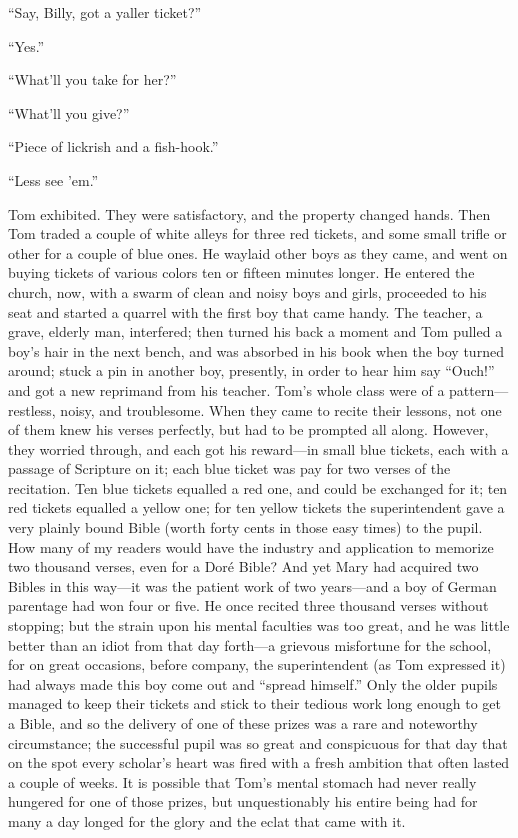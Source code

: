 \documentclass{book}
\begin{document}
“Say, Billy, got a yaller ticket?”

“Yes.”

“What’ll you take for her?”

“What’ll you give?”

“Piece of lickrish and a fish-hook.”

“Less see ’em.”

Tom exhibited. They were satisfactory, and the property changed hands. Then Tom traded a couple of white alleys for three red tickets, and some small trifle or other for a couple of blue ones. He waylaid other boys as they came, and went on buying tickets of various colors ten or fifteen minutes longer. He entered the church, now, with a swarm of clean and noisy boys and girls, proceeded to his seat and started a quarrel with the first boy that came handy. The teacher, a grave, elderly man, interfered; then turned his back a moment and Tom pulled a boy’s hair in the next bench, and was absorbed in his book when the boy turned around; stuck a pin in another boy, presently, in order to hear him say “Ouch!” and got a new reprimand from his teacher. Tom’s whole class were of a pattern—restless, noisy, and troublesome. When they came to recite their lessons, not one of them knew his verses perfectly, but had to be prompted all along. However, they worried through, and each got his reward—in small blue tickets, each with a passage of Scripture on it; each blue ticket was pay for two verses of the recitation. Ten blue tickets equalled a red one, and could be exchanged for it; ten red tickets equalled a yellow one; for ten yellow tickets the superintendent gave a very plainly bound Bible (worth forty cents in those easy times) to the pupil. How many of my readers would have the industry and application to memorize two thousand verses, even for a Doré Bible? And yet Mary had acquired two Bibles in this way—it was the patient work of two years—and a boy of German parentage had won four or five. He once recited three thousand verses without stopping; but the strain upon his mental faculties was too great, and he was little better than an idiot from that day forth—a grievous misfortune for the school, for on great occasions, before company, the superintendent (as Tom expressed it) had always made this boy come out and “spread himself.” Only the older pupils managed to keep their tickets and stick to their tedious work long enough to get a Bible, and so the delivery of one of these prizes was a rare and noteworthy circumstance; the successful pupil was so great and conspicuous for that day that on the spot every scholar’s heart was fired with a fresh ambition that often lasted a couple of weeks. It is possible that Tom’s mental stomach had never really hungered for one of those prizes, but unquestionably his entire being had for many a day longed for the glory and the eclat that came with it.
\end{document}
